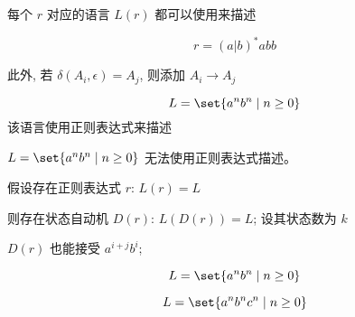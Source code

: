 \begin{frame}{}
  \begin{center}
    每个 $r$ 对应的语言 $L(r)$ 都可以使用来描述

    \[
      r = (a | b)^{\ast} abb
    \]

    \pause

    \pause
    此外, 若 $\delta(A_i, \epsilon) = A_{j}$, 则添加 $A_{i} \to A_{j}$
  \end{center}
\end{frame}

\begin{frame}{}
  \begin{center}
    

    \[
      L = \set{a^{n} b^{n} \mid n \ge 0}
    \]
    该语言使用正则表达式来描述
  \end{center}
\end{frame}

\begin{frame}{}
  \begin{theorem}
    $L = \set{a^{n} b^{n} \mid n \ge 0}$ 无法使用正则表达式描述。
  \end{theorem}

  \pause
  \begin{center}

    \pause
    \vspace{0.30cm}
    假设存在正则表达式 $r$: $L(r) = L$

    \pause
    \vspace{0.30cm}
    则存在状态自动机 $D(r)$: $L(D(r)) = L$; 设其状态数为 $k$

    \pause
    \vspace{0.30cm}

    \pause
    \vspace{0.30cm}
    $D(r)$ 也能接受 $a^{i+j} b^{i}$; 
  \end{center}
\end{frame}

\begin{frame}{}
  \begin{center}
    \[
      L = \set{a^{n}b^{n} \mid n \ge 0}
    \]
    \href{https://en.wikipedia.org/wiki/Pumping\_lemma\_for\_regular\_languages}{
      }

    \pause
    \vspace{0.60cm}
    \[
      L = \set{a^{n}b^{n}c^{n} \mid n \ge 0}
    \]
    \href{https://en.wikipedia.org/wiki/Pumping\_lemma\_for\_context-free\_languages}{
      }
  \end{center}
\end{frame}

